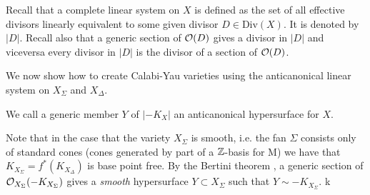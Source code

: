\documentclass[../main.tex]{subfiles}
\begin{document}
Recall that a complete linear system on $X$ is defined as the set of all effective divisors linearly equivalent to some given divisor 
$D \in {\text{Div}}(X)$. It is denoted by $|D|$.
Recall also that a generic section of $\mathcal{O}(D)$ gives a divisor in $|D|$ and viceversa every divisor in $|D|$ is the divisor of a section of $\mathcal{O}(D)$.

We now show how to create Calabi-Yau varieties using the anticanonical linear system on $X_\Sigma$ and $X_\Delta$.

We call a generic member $Y$ of $|-K_{X}|$ an anticanonical hypersurface for $X$.

Note that in the case that the variety $X_\Sigma$ is smooth, i.e. the fan $\Sigma$ consists only of standard cones (cones generated by part of a $\mathbb{Z}$-basis for M) we have that  $K_{X_\Sigma}= f^*(K_{X_\Delta})$ is base point free.
By the Bertini theorem \cite[Cor. III.10.9]{Har77}, a generic section of $\mathcal{O}_{X_\Sigma}(-K_{X_\Sigma})$ gives a \emph{smooth} hypersurface $Y \subset X_\Sigma$ such that $Y \sim -K_{X_\Sigma}$. 
k
\end{document}
